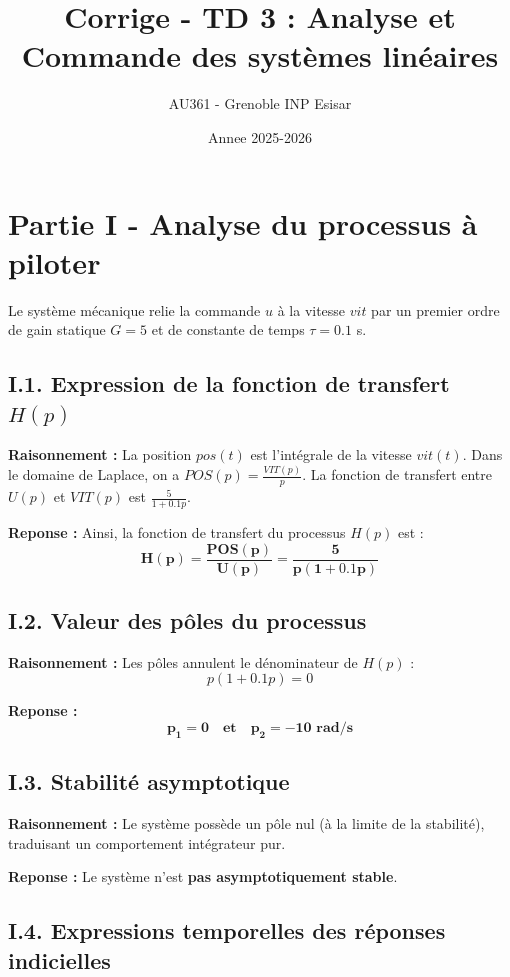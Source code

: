 \documentclass[11pt,a4paper]{article}
\title{Corrige - TD 3 : Analyse et Commande des systèmes linéaires}
\author{AU361 - Grenoble INP Esisar}
\date{Annee 2025-2026}
\begin{document}
\maketitle

\section*{Partie I - Analyse du processus à piloter}

Le système mécanique relie la commande $u$ à la vitesse $vit$ par un premier ordre de gain statique $G=5$ et de constante de temps $\tau=0.1$ s.

\subsection*{I.1. Expression de la fonction de transfert $H(p)$}

\textbf{Raisonnement :} La position $pos(t)$ est l'intégrale de la vitesse $vit(t)$. Dans le domaine de Laplace, on a $POS(p) = \frac{VIT(p)}{p}$. La fonction de transfert entre $U(p)$ et $VIT(p)$ est $\frac{5}{1+0.1p}$.

\textbf{Reponse :} Ainsi, la fonction de transfert du processus $H(p)$ est :
$$ 
\mathbf{H(p) = \frac{POS(p)}{U(p)} = \frac{5}{p(1+0.1p)}} 
$$

\subsection*{I.2. Valeur des pôles du processus}

\textbf{Raisonnement :} Les pôles annulent le dénominateur de $H(p)$ :
$$ 
p(1+0.1p) = 0 
$$

\textbf{Reponse :} 
$$ 
\mathbf{p_1 = 0 \quad \text{et} \quad p_2 = -10 \text{ rad/s}} 
$$

\subsection*{I.3. Stabilité asymptotique}

\textbf{Raisonnement :} Le système possède un pôle nul (à la limite de la stabilité), traduisant un comportement intégrateur pur.

\textbf{Reponse :} Le système n'est \textbf{pas asymptotiquement stable}.

\subsection*{I.4. Expressions temporelles des réponses indicielles}
\end{document}
